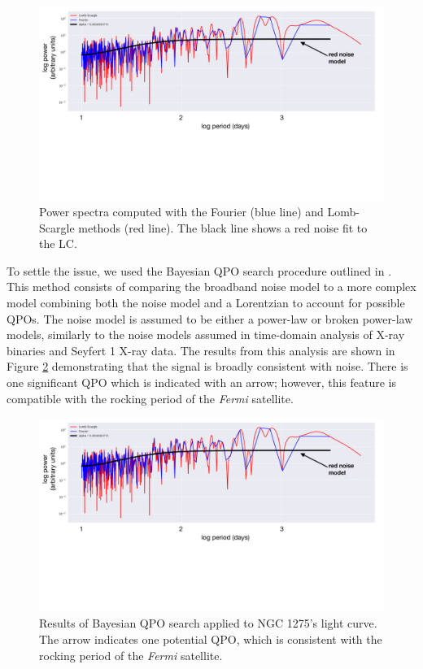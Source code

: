 \documentclass{iau}
\begin{document}
\begin{figure}[h]
\begin{center}
\includegraphics[width=0.8\linewidth, page=1, trim=0 300 150 0,clip=true]{figures/plots.pdf} 
\caption{Power spectra computed with the Fourier (blue line) and  Lomb-Scargle methods (red line). The black line shows a red noise fit to the LC.  }
\label{fourier}
\end{center}
\end{figure}

To settle the issue, we used the Bayesian QPO search procedure outlined in \cite{Huppenkothen2013}. This method consists of comparing the broadband noise model to a more complex model combining both the noise model and a Lorentzian to account for possible QPOs. The noise model is assumed to be either a power-law or broken power-law models, similarly to the noise models assumed in time-domain analysis of X-ray binaries and Seyfert 1 X-ray data. The results from this analysis are shown in Figure \ref{bayes} demonstrating that the signal is broadly consistent with noise. There is one significant QPO which is indicated with an arrow; however, this feature is compatible with the rocking period of the \textit{Fermi} satellite.

\begin{figure}[h]
\begin{center}
\includegraphics[width=\linewidth, page=2, trim=50 0 50 0,clip=true]{figures/plots.pdf} 
\caption{Results of Bayesian QPO search applied to NGC 1275's light curve. The arrow indicates one potential QPO, which is consistent with the rocking period of the \textit{Fermi} satellite. }
\label{bayes}
\end{center}
\end{figure}
\end{document}
